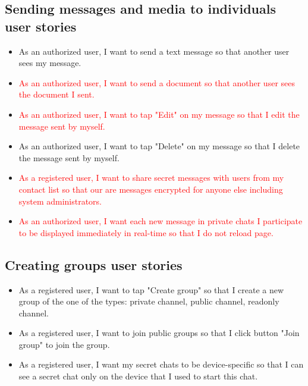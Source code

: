 \subsection{Sending messages and media to individuals user stories}
\label{subsec:sending-messages-and-media-feature-user-stories}
\begin{itemize}
    \item As an authorized user, I want to send a text message so that another user sees my message.
    \item \textcolor{red}{As an authorized user, I want to send a document so that another user sees the document I sent.}
    \item \textcolor{red}{As an authorized user, I want to tap "Edit" on my message so that I edit the message sent by myself.}
    \item As an authorized user, I want to tap "Delete" on my message so that I delete the message sent by myself.
    \item \textcolor{red}{As a registered user, I want to share secret messages with users from my contact list so that our are messages encrypted for anyone else including system administrators.}
    \item \textcolor{red}{As an authorized user, I want each new message in private chats I participate to be displayed immediately in real-time so that I do not reload page.}
\end{itemize}

\subsection{Creating groups user stories}\label{subsec:creating-groups-feature-user-stories}
\begin{itemize}
    \item As a registered user, I want to tap "Create group" so that I create a new group of the one of the types: private channel, public channel, readonly channel.
    \item As a registered user, I want to join public groups so that I click button "Join group" to join the group.
    \item As a registered user, I want my secret chats to be device-specific so that I can see a secret chat only on the device that I used to start this chat.
\end{itemize}

